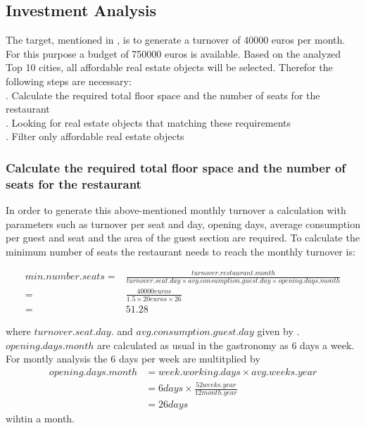 \subsection{Investment Analysis}
\label{subsec:moneten}
The target, mentioned in , is to generate a turnover of 40000 euros per month. For this purpose
 a budget of 750000 euros is available. Based on the analyzed Top 10 cities, all affordable real estate objects will be
 selected. Therefor the following steps are necessary: \\
. Calculate the required total floor space and the number of seats for the restaurant \\
. Looking for real estate objects that matching these requirements \\
. Filter only affordable real estate objects \\

\subsubsection{Calculate the required total floor space and the number of seats for the restaurant}
In order to generate this above-mentioned monthly turnover a calculation with parameters such as turnover per seat and day,
 opening days, average consumption per guest and seat and the area of the guest section are required. To calculate the
 minimum number of seats the restaurant needs to reach the monthly turnover is:
\begin{center}
\begin{equation}
\begin{aligned}
	min.number.seats =&\frac{turnover.restaurant.month}{turnover.seat.day \times avg.consumption.guest.day \times opening.days.month} \\
	=&\frac{40000 euros}{1.5 \times 20 euros \times 26} \\
	=&51.28
\end{aligned}
\label{eq:number_seats_benchmark}
\end{equation}
\end{center}

where $turnover.seat.day.$ and $avg.consumption.guest.day$ given by \cite{BenchmarkGastronomie}. $opening.days.month$
 are calculated as usual in the gastronomy as 6 days a week. For montly analysis the 6 days per week are multitplied by
\begin{equation}
    \begin{aligned}
        opening.days.month & = week.working.days \times avg.weeks.year \\
        & = 6 days \times \frac{52 weeks.year}{12 month.year} \\
        & = 26 days
    \end{aligned}
    \label{eq:opening_days}
\end{equation}
wihtin a month.


